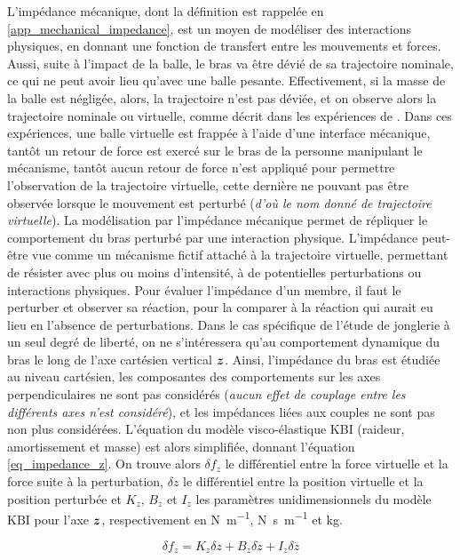 \documentclass[12pt, a4paper]{article} %
\numberwithin{equation}{section}
\begin{document}
L'impédance mécanique, dont la définition est rappelée en \cref{app_mechanical_impedance}, est un moyen de modéliser des interactions physiques, en donnant une fonction de transfert entre les mouvements et forces.
%
\newlineBlank
%
Aussi, suite à l'impact de la balle, le bras va être dévié de sa trajectoire nominale, ce qui ne peut avoir lieu qu'avec une balle pesante. Effectivement, si la masse de la balle est négligée, alors, la trajectoire n'est pas déviée, et on observe alors la trajectoire nominale ou virtuelle, comme décrit dans les expériences de \cite{tsuji_bio-mimetic_2008}. Dans ces expériences, une balle virtuelle est frappée à l'aide d'une interface mécanique, tantôt un retour de force est exercé sur le bras de la personne manipulant le mécanisme, tantôt aucun retour de force n'est appliqué pour permettre l'observation de la trajectoire virtuelle, cette dernière ne pouvant pas être observée lorsque le mouvement est perturbé (\textit{d'où le nom donné de trajectoire virtuelle}). 
%
\newlineBlank
%
La modélisation par l'impédance mécanique permet de répliquer le comportement du bras perturbé par une interaction physique. L'impédance peut-être vue comme un mécanisme fictif attaché à la trajectoire virtuelle, permettant de résister avec plus ou moins d'intensité, à de potentielles perturbations ou interactions physiques. Pour évaluer l'impédance d'un membre, il faut le perturber et observer sa réaction, pour la comparer à la réaction qui aurait eu lieu en l'absence de perturbations.
%
\newlineBlank
%
Dans le cas spécifique de l'étude de jonglerie à un seul degré de liberté, on ne s'intéressera qu'au comportement dynamique du bras le long de l'axe cartésien vertical $ \vect{z} $. Ainsi, l'impédance du bras est étudiée au niveau cartésien, les composantes des comportements sur les axes perpendiculaires ne sont pas considérés (\textit{aucun effet de couplage entre les différents axes n'est considéré}), et les impédances liées aux couples ne sont pas non plus considérées. L'équation du modèle visco-élastique KBI (raideur, amortissement et masse) est alors simplifiée, donnant l'équation \cref{eq_impedance_z}. On trouve alors $ \delta f_z $ le différentiel entre la force virtuelle et la force suite à la perturbation, $ \delta z $ le différentiel entre la position virtuelle et la position perturbée et $ K_z $, $ B_z $ et $ I_z $ les paramètres unidimensionnels du modèle KBI pour l'axe $ \vect{z} $, respectivement en \si{\newton\per\metre}, \si{\newton\second\per\metre} et \si{\kilogram}.

\begin{equation} \label{eq_impedance_z}
	\delta f_z = K_z\delta z + B_z\delta\dot{z} + I_z\delta\ddot{z} 
\end{equation}
\end{document}
